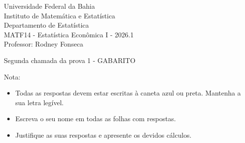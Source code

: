 \documentclass{article}
\date{--/--/----} %
\begin{document}
\begin{flushleft}
	Universidade Federal da Bahia\\
	Instituto de Matemática e Estatística\\
	Departamento de Estatística\\
	MATF14 - Estatística Econômica I - 2026.1\\
	Professor: Rodney Fonseca \\
\end{flushleft}

\begin{center}
	\begin{Large}
		Segunda chamada da prova 1 {\color{blue} - GABARITO} \\
	\end{Large}	
\end{center}

\hspace{2em} Nota: 

\vspace{1em}

\begin{flushleft}
\begin{small}

\begin{itemize}
	\item Todas as respostas devem estar escritas à caneta azul ou preta. Mantenha a sua letra legível.
	\item Escreva o seu nome em todas as folhas com respostas.
	\item Justifique as suas respostas e apresente os devidos cálculos.
\end{itemize}

\end{small}
\end{flushleft}

\vspace{1em}

\end{document}
